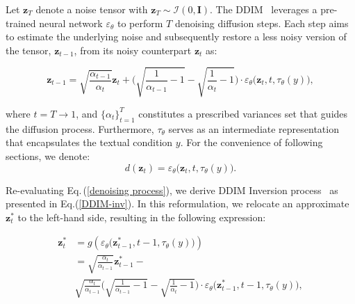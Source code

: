 \documentclass[letterpaper]{article} %
\begin{document}
Let \(\mathbf{z}_T\) denote a noise tensor with \(\mathbf{z}_T \sim \mathcal{I}(0, \mathbf{I})\). The DDIM~\cite{couairon2023diffedit} leverages a pre-trained neural network \(\varepsilon_{\theta}\) to perform \(T\) denoising diffusion steps. Each step aims to estimate the underlying noise and subsequently restore a less noisy version of the tensor, \(\mathbf{z}_{t-1}\), from its noisy counterpart \(\mathbf{z}_t\) as:
\begin{small}
\begin{equation}
\label{denoising process}
    \mathbf{z}_{t-1} = \sqrt{\frac{\alpha_{t-1}}{\alpha_t}}\mathbf{z}_t + \Bigg(\sqrt{\frac{1}{\alpha_{t-1}} - 1} - \sqrt{\frac{1}{\alpha_t} - 1} \Bigg)\cdot \varepsilon_{\theta}\big(\mathbf{z}_t,t,\tau_{\theta}(y)\big),
\end{equation}
\end{small}
where \( t = T \rightarrow 1\), and \( \{\alpha_t\}_{t=1}^T \) constitutes a prescribed variances set that guides the diffusion process. Furthermore, \( \tau_{\theta} \) serves as an intermediate representation that encapsulates the textual condition \( y \).  For the convenience of following sections, we denote:
\begin{equation}\label{eq:noise}
  d(\mathbf{z}_t) = \varepsilon_{\theta}\big(\mathbf{z}_t,t,\tau_{\theta}(y)\big).   
\end{equation}



Re-evaluating Eq.\,(\ref{denoising process}), we derive DDIM Inversion process~\cite{couairon2023diffedit} as presented in Eq.(\ref{DDIM-inv}). In this reformulation, we relocate an approximate $\mathbf{z}^*_t$ to the left-hand side, resulting in the following expression:
\begin{small}
\begin{equation}
\label{DDIM-inv}
\begin{split}
\mathbf{z}^*_t &= g\left(\varepsilon_{\theta}\big(\mathbf{z}^*_{t-1},t-1,\tau_{\theta}(y)\big)\right) \\&= \sqrt{\frac{\alpha_{t}}{\alpha_{t-1}}}\mathbf{z}^*_{t-1} -\\& \sqrt{\frac{\alpha_{t}}{\alpha_{t-1}}}\Bigg(\sqrt{\frac{1}{\alpha_{t-1}} - 1} - \sqrt{\frac{1}{\alpha_t} - 1} \Bigg) \cdot \varepsilon_{\theta}\big(\mathbf{z}^*_{t-1},t-1,\tau_{\theta}(y)\big),
\end{split}
\end{equation}
\end{small}
\end{document}
